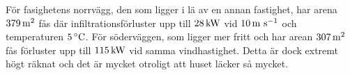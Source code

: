 För fasighetens norrvägg, den som ligger i lä av en annan fastighet, har arena $\unit[379]{m^2}$ fås där infiltrationsförluster upp till $\unit[28]{kW}$ vid $\unit[10]{m~s^{-1}}$ och temperaturen $\unit[5]{^\circ C}$. För söderväggen, som ligger mer fritt och har arean $\unit[307]{m^2}$ fås förluster upp till $\unit[115]{kW}$ vid samma vindhastighet. Detta är dock extremt högt räknat och det är mycket otroligt att huset läcker så mycket.

